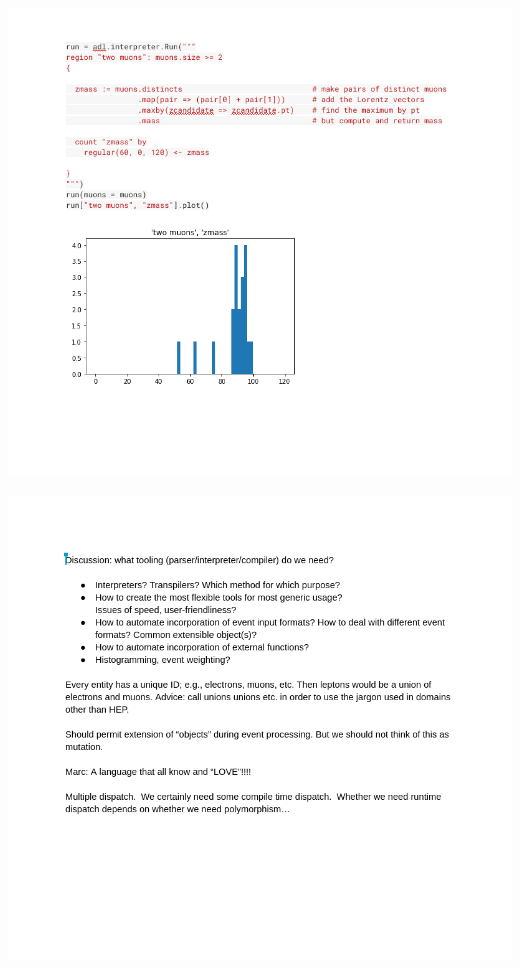 \documentclass[aspectratio=169]{beamer}
\begin{document}
\begin{frame}{}
\vspace{-0.5 cm}
\begin{center}
\includegraphics[height=9.3 cm]{slides-18.png}
\end{center}
\end{frame}

\begin{frame}{}
\vspace{-0.5 cm}
\begin{center}
\includegraphics[height=9.3 cm]{slides-19.png}
\end{center}
\end{frame}
\end{document}
